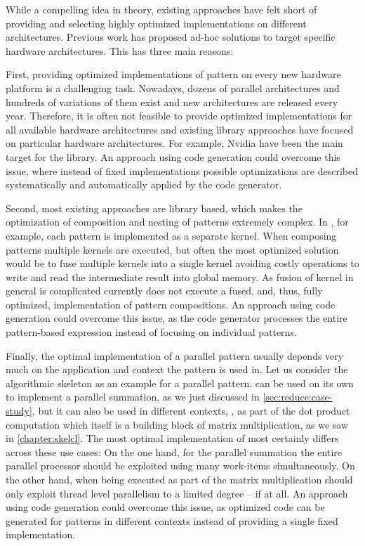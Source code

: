 While a compelling idea in theory, existing approaches have felt short of providing and selecting highly optimized implementations on different architectures.
Previous work has proposed ad-hoc solutions to target specific hardware architectures.
This has three main reasons:

First, providing optimized implementations of pattern on every new hardware platform is a challenging task.
Nowadays, dozens of parallel architectures and hundreds of variations of them exist and new architectures are released every year.
Therefore, it is often not feasible to provide optimized implementations for all available hardware architectures and existing library approaches have focused on particular hardware architectures.
For example, Nvidia \GPUs have been the main target for the \SkelCL library.
An approach using code generation could overcome this issue, where instead of fixed implementations possible optimizations are described systematically and automatically applied by the code generator.

Second, most existing approaches are library based, which makes the optimization of composition and nesting of patterns extremely complex.
In \SkelCL, for example, each pattern is implemented as a separate \OpenCL kernel.
When composing patterns multiple \OpenCL kernels are executed, but often the most optimized solution would be to fuse multiple \OpenCL kernels into a single \OpenCL kernel avoiding costly operations to write and read the intermediate result into global memory.
As fusion of \OpenCL kernel in general is complicated \SkelCL currently does not execute a fused, and, thus, fully optimized, implementation of pattern compositions.
An approach using code generation could overcome this issue, as the code generator processes the entire pattern-based expression instead of focusing on individual patterns.

Finally, the optimal implementation of a parallel pattern usually depends very much on the application and context the pattern is used in.
Let us consider the algorithmic skeleton \reduce as an example for a parallel pattern.
\reduce can be used on its own to implement a parallel summation, as we just discussed in \autoref{sec:reduce:case-study}, but it can also be used in different contexts, \eg, as part of the dot product computation which itself is a building block of matrix multiplication, as we saw in \autoref{chapter:skelcl}.
The most optimal implementation of \reduce most certainly differs across these use cases:
On the one hand, for the parallel summation the entire parallel processor should be exploited using many \OpenCL work-items simultaneously.
On the other hand, when being executed as part of the matrix multiplication \reduce should only exploit thread level parallelism to a limited degree -- if at all.
An approach using code generation could overcome this issue, as optimized code can be generated for patterns in different contexts instead of providing a single fixed implementation.


